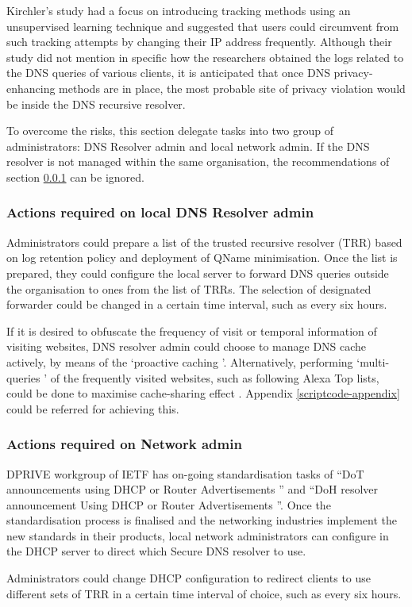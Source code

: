 Kirchler's study had a focus on introducing tracking methods using an unsupervised learning technique and suggested that users could circumvent from such tracking attempts by changing their IP address frequently.
Although their study did not mention in specific how the researchers obtained the logs related to the DNS queries of various clients, it is anticipated that once DNS privacy-enhancing methods are in place, the most probable site of privacy violation would be inside the DNS recursive resolver.

To overcome the risks, this section delegate tasks into two group of administrators: DNS Resolver admin and local network admin.
If the DNS resolver is not managed within the same organisation, the recommendations of section \ref{dnsresolveradmin} can be ignored.

\subsubsection{Actions required on local DNS Resolver admin}\label{dnsresolveradmin}
Administrators could prepare a list of the trusted recursive resolver (TRR) based on log retention policy and deployment of QName minimisation.
Once the list is prepared, they could configure the local server to forward DNS queries outside the organisation to ones from the list of TRRs.
The selection of designated forwarder could be changed in a certain time interval, such as every six hours.

If it is desired to obfuscate the frequency of visit or temporal information of visiting websites, DNS resolver admin could choose to manage DNS cache actively, by means of the `proactive caching \cite{cohen2003proactive}'. Alternatively, performing `multi-queries \cite{siby2018dns}' of the frequently visited websites, such as following Alexa Top lists, could be done to maximise cache-sharing effect \cite{wang2013analysis}. Appendix \ref{scriptcode-appendix} could be referred for achieving this.

\subsubsection{Actions required on Network admin}
DPRIVE workgroup of IETF has on-going standardisation tasks of ``DoT announcements using DHCP or Router Advertisements \cite{peterson-dot-dhcp-00}'' and ``DoH resolver announcement Using DHCP or Router Advertisements \cite{peterson-doh-dhcp-00}''.
Once the standardisation process is finalised and the networking industries implement the new standards in their products, local network administrators can configure in the DHCP server to direct which Secure DNS resolver to use.

Administrators could change DHCP configuration to redirect clients to use different sets of TRR in a certain time interval of choice, such as every six hours.